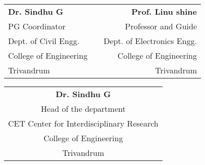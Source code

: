 \begin{singlespace}
	\begin{center}
		\begin{tabular}{ p{6cm} p{2cm} r } 
			\textbf{Dr. Sindhu G} &&  \textbf{Prof. Linu shine} \\ 
			PG Coordinator && Professor and Guide\\ 
			Dept. of Civil Engg. && Dept. of Electronics Engg.\\
			College of Engineering && College of Engineering\\
			Trivandrum && Trivandrum\\
		\end{tabular}
	\end{center}
	
	\vspace*{2cm}
	\begin{center}
		\begin{tabular}{c} 
			\textbf{Dr. Sindhu G} \\ 
			Head of the department\\ 
			CET Center for  Interdisciplinary Research\\
			College of Engineering\\ 
			Trivandrum\\
			
		\end{tabular}
	\end{center}
\end{singlespace}